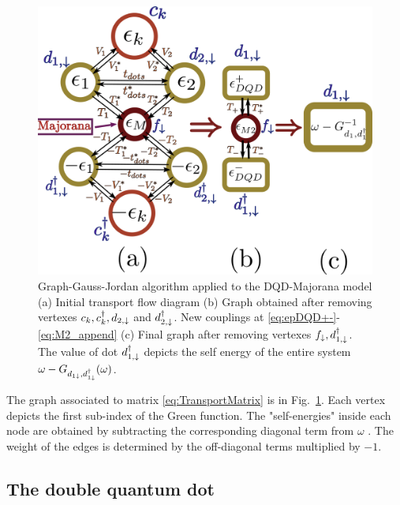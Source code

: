 \documentclass[showpacs,aps,prb,reprint,superscriptaddress]{revtex4-1}
\begin{document}
 

    \begin{figure}[t]
    \begin{center}
    \centering
     \includegraphics[scale=0.29]{Graficos/Graphs-DQD-M-Pro.png}
    \caption{ Graph-Gauss-Jordan algorithm \cite{spielman_algorithms_2010}  applied to the DQD-Majorana model (a) Initial transport flow diagram  (b) Graph obtained after removing vertexes $c_k,c^\dagger_k, d_{2,\downarrow}$ and $ d^\dagger_{2,\downarrow}$. New couplings at \eqref{eq:epDQD+-}-\eqref{eq:M2_append} (c) Final graph after removing vertexes $f_\downarrow, d^\dagger_{1,\downarrow}$. The value of dot $d^\dagger_{1,\downarrow}$ depicts the self energy of the entire system $\omega-G_{d_{1\downarrow},d_{1\downarrow}^\dagger}(\omega)$.  \label{fig:GaussJordanGraph}
    }
    
    \end{center}
    \end{figure}


The graph associated to  matrix \eqref{eq:TransportMatrix} is in Fig.\ \ref{fig:GaussJordanGraph}. Each vertex depicts the first sub-index of the Green function. The "self-energies" inside each node are obtained by subtracting the corresponding diagonal term from $\omega$ . The weight of the edges is determined by the  off-diagonal terms multiplied by $-1$. 




\subsection{The double quantum dot}
\end{document}
